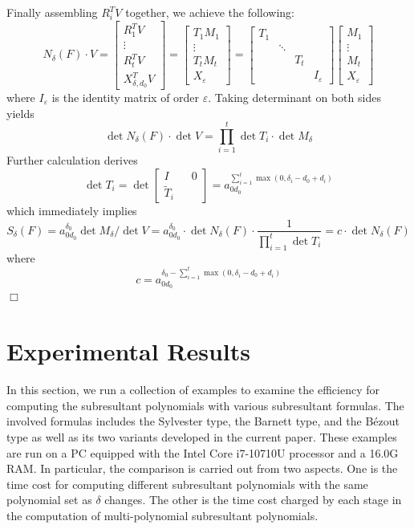 \documentclass{article}
\newenvironment{proof}{\noindent{\em Proof:}}{$\Box$~\\}
\begin{document}
\begin{proof}
Finally assembling $R_i^TV$ together, we achieve the following:
\[
N_\delta (F) \cdot V=\begin{bmatrix}
R_1^TV\\[3pt]\vdots\\[3pt]R_t^T V\\[3pt]X_{\delta ,{d_0}} ^TV
\end{bmatrix}=\begin{bmatrix}
T_1M_1\\
\vdots\\
T_tM_t\\
X_{\varepsilon}
\end{bmatrix}=\begin{bmatrix}
T_1\\
&\ddots\\
&&T_t\\
&&&I_{\varepsilon}
\end{bmatrix}\begin{bmatrix}
M_1\\
\vdots\\
M_t\\
X_{\varepsilon}
\end{bmatrix}
\]
where $I_{\varepsilon}$ is the identity matrix of order $\varepsilon$.
Taking determinant on both sides yields
\[\det N_\delta (F) \cdot \det V=\prod_{i=1}^t\det T_i\cdot \det M_{\delta}\]
Further calculation derives
\[\det T_i=\det \left[\begin{array}{c}
I\qquad 0\\\hline
\tilde{T}_i
\end{array}\right]=a_{0d_0}^{\sum_{i=1}^t\max(0,\delta_i-d_0+d_i)}\]
which immediately implies
$$S_{\delta}(F)=a_{0d_0}^{\delta_0}\det M_{\delta}/\det V=a_{0d_0}^{\delta_0}\cdot\det N_\delta (F)\cdot\frac{1}{\prod_{i=1}^t\det T_i}=c\cdot\det N_\delta (F) $$
where
\[c=a_{0d_0}^{\delta_0-\sum_{i=1}^t\max(0,\delta_i-d_0+d_i)}\]
\end{proof}

\section{Experimental Results}\label{sec:experiments}

In this section, we run a collection of examples to examine the efficiency for computing the subresultant polynomials with various subresultant formulas. The involved formulas includes the Sylvester type, the Barnett type, and the B\'ezout type as well as its two variants developed in the current paper. These examples are run on a PC equipped with the Intel Core i7-10710U processor and a 16.0G RAM. In particular, the comparison is carried out from two aspects. One is the time cost for computing different  subresultant polynomials with the same polynomial set as  $\delta$ changes. The other is the time cost charged by each stage in the computation of  multi-polynomial subresultant polynomials.
\end{document}
